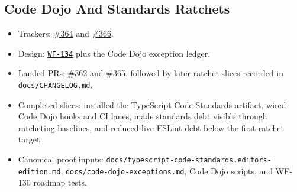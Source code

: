 \subsection{Code Dojo And Standards Ratchets}\label{record-261-code-dojo-and-standards-ratchets}

\begin{itemize}
\tightlist
\item
  Trackers: \href{https://github.com/flyingrobots/bijou/issues/364}{\#364} and \href{https://github.com/flyingrobots/bijou/issues/366}{\#366}.
\item
  Design: \href{https://github.com/flyingrobots/bijou/blob/cbd70612140e7a450d764b3c7be1c6af878b99bc/docs/design/WF-134-code-dojo-eslint-ratchet-1.md}{\texttt{W\allowbreak{}F\allowbreak{}-\allowbreak{}1\allowbreak{}3\allowbreak{}4}} plus the Code Dojo exception ledger.
\item
  Landed PRs: \href{https://github.com/flyingrobots/bijou/pull/362}{\#362} and \href{https://github.com/flyingrobots/bijou/pull/365}{\#365}, followed by later ratchet slices recorded in \texttt{d\allowbreak{}o\allowbreak{}c\allowbreak{}s\allowbreak{}/\allowbreak{}C\allowbreak{}H\allowbreak{}A\allowbreak{}N\allowbreak{}G\allowbreak{}E\allowbreak{}L\allowbreak{}O\allowbreak{}G\allowbreak{}.\allowbreak{}m\allowbreak{}d}.
\item
  Completed slices: installed the TypeScript Code Standards artifact, wired Code Dojo hooks and CI lanes, made standards debt visible through ratcheting baselines, and reduced live ESLint debt below the first ratchet target.
\item
  Canonical proof inputs: \texttt{d\allowbreak{}o\allowbreak{}c\allowbreak{}s\allowbreak{}/\allowbreak{}t\allowbreak{}y\allowbreak{}p\allowbreak{}e\allowbreak{}s\allowbreak{}c\allowbreak{}r\allowbreak{}i\allowbreak{}p\allowbreak{}t\allowbreak{}-\allowbreak{}c\allowbreak{}o\allowbreak{}d\allowbreak{}e\allowbreak{}-\allowbreak{}s\allowbreak{}t\allowbreak{}a\allowbreak{}n\allowbreak{}d\allowbreak{}a\allowbreak{}r\allowbreak{}d\allowbreak{}s\allowbreak{}.\allowbreak{}e\allowbreak{}d\allowbreak{}i\allowbreak{}t\allowbreak{}o\allowbreak{}r\allowbreak{}s\allowbreak{}-\allowbreak{}e\allowbreak{}d\allowbreak{}i\allowbreak{}t\allowbreak{}i\allowbreak{}o\allowbreak{}n\allowbreak{}.\allowbreak{}m\allowbreak{}d}, \texttt{d\allowbreak{}o\allowbreak{}c\allowbreak{}s\allowbreak{}/\allowbreak{}c\allowbreak{}o\allowbreak{}d\allowbreak{}e\allowbreak{}-\allowbreak{}d\allowbreak{}o\allowbreak{}j\allowbreak{}o\allowbreak{}-\allowbreak{}e\allowbreak{}x\allowbreak{}c\allowbreak{}e\allowbreak{}p\allowbreak{}t\allowbreak{}i\allowbreak{}o\allowbreak{}n\allowbreak{}s\allowbreak{}.\allowbreak{}m\allowbreak{}d}, Code Dojo scripts, and WF-130 roadmap tests.

\end{itemize}
